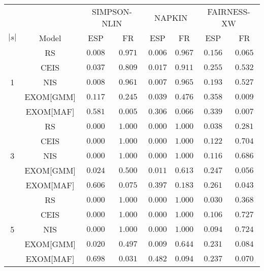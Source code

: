 
\label{tab:1}
\centering
\begin{tabular}{cccccccc}
    \toprule
    \multicolumn{2}{c}{} & \multicolumn{2}{c}{SIMPSON-NLIN} & \multicolumn{2}{c}{NAPKIN} & \multicolumn{2}{c}{FAIRNESS-XW}\\
    \cmidrule(lr){3-4} \cmidrule(lr){5-6} \cmidrule(lr){7-8}
    $|s|$ & Model & \multicolumn{1}{c}{ESP} & \multicolumn{1}{c}{FR} & \multicolumn{1}{c}{ESP} & \multicolumn{1}{c}{FR} & \multicolumn{1}{c}{ESP} & \multicolumn{1}{c}{FR}\\
    \midrule
    \multirow{5}{*}{1} & RS & $0.008$ & $0.971$ & $0.006$ & $0.967$ & $0.156$ & $0.065$\\
    & CEIS & $0.037$ & $0.809$ & $0.017$ & $0.911$ & $0.255$ & $0.532$\\
    & NIS & $0.008$ & $0.961$ & $0.007$ & $0.965$ & $0.193$ & $0.527$\\
    & EXOM[GMM] & $0.117$ & $0.245$ & $0.039$ & $0.476$ & $\mathbf{0.358}$ & $0.009$\\
    & EXOM[MAF] & $\mathbf{0.581}$ & $\mathbf{0.005}$ & $\mathbf{0.306}$ & $\mathbf{0.066}$ & $0.339$ & $\mathbf{0.007}$\\
    \midrule
    \multirow{5}{*}{3} & RS & $0.000$ & $1.000$ & $0.000$ & $1.000$ & $0.038$ & $0.281$\\
    & CEIS & $0.000$ & $1.000$ & $0.000$ & $1.000$ & $0.122$ & $0.704$\\
    & NIS & $0.000$ & $1.000$ & $0.000$ & $1.000$ & $0.116$ & $0.686$\\
    & EXOM[GMM] & $0.024$ & $0.500$ & $0.011$ & $0.613$ & $0.247$ & $0.056$\\
    & EXOM[MAF] & $\mathbf{0.606}$ & $\mathbf{0.075}$ & $\mathbf{0.397}$ & $\mathbf{0.183}$ & $\mathbf{0.261}$ & $\mathbf{0.043}$\\
    \midrule
    \multirow{5}{*}{5} & RS & $0.000$ & $1.000$ & $0.000$ & $1.000$ & $0.030$ & $0.368$\\
    & CEIS & $0.000$ & $1.000$ & $0.000$ & $1.000$ & $0.106$ & $0.727$\\
    & NIS & $0.000$ & $1.000$ & $0.000$ & $1.000$ & $0.094$ & $0.724$\\
    & EXOM[GMM] & $0.020$ & $0.497$ & $0.009$ & $0.644$ & $0.231$ & $0.084$\\
    & EXOM[MAF] & $\mathbf{0.698}$ & $\mathbf{0.031}$ & $\mathbf{0.482}$ & $\mathbf{0.094}$ & $\mathbf{0.237}$ & $\mathbf{0.070}$\\
    \bottomrule
\end{tabular}
